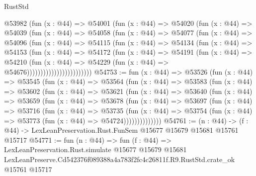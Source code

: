\begin{lexlean}{RustStd}
\begin{coremodule}
                      @53982
                        (fun (x : @44) =>
                        @54001
                          (fun (x : @44) =>
                          @54020
                            (fun (x : @44) =>
                            @54039
                              (fun (x : @44) =>
                              @54058
                                (fun (x : @44) =>
                                @54077
                                  (fun (x : @44) =>
                                  @54096
                                    (fun (x : @44) =>
                                    @54115
                                      (fun (x : @44) =>
                                      @54134
                                        (fun (x : @44) =>
                                        @54153
                                          (fun (x : @44) =>
                                          @54172
                                            (fun (x : @44) =>
                                            @54191
                                              (fun (x : @44) =>
                                              @54210
                                                (fun (x : @44) =>
                                                @54229
                                                  (fun (x : @44) => @54676))))))))))))))))))))))))
@54753 := fun (x : @44) =>
  @53526
    (fun (x : @44) =>
    @53545
      (fun (x : @44) =>
      @53564
        (fun (x : @44) =>
        @53583
          (fun (x : @44) =>
          @53602
            (fun (x : @44) =>
            @53621
              (fun (x : @44) =>
              @53640
                (fun (x : @44) =>
                @53659
                  (fun (x : @44) =>
                  @53678
                    (fun (x : @44) =>
                    @53697
                      (fun (x : @44) =>
                      @53716
                        (fun (x : @44) =>
                        @53735
                          (fun (x : @44) =>
                          @53754 (fun (x : @44) => @53773 (fun (x : @44) => @54724))))))))))))))
@54761 := (n : @44) ->
  (f : @44) -> LexLeanPreservation.Rust.FunSem @15677 @15679 @15681 @15761 @15717
@54771 := fun (n : @44) =>
  fun (f : @44) =>
  LexLeanPreservation.Rust.simulate
    @15677
    @15679
    @15681
    LexLeanPreserve.Cd542376f089388a4a783f2fc4c26811f.R9.RustStd.crate_ok
    @15761
    @15717
\end{coremodule}
\end{lexlean}

